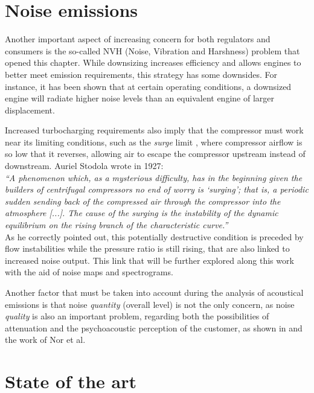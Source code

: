 \section{Noise emissions}

Another important aspect of increasing concern for both regulators and consumers is the so-called NVH (Noise, Vibration and Harshness) problem that opened this chapter. While downsizing increases efficiency and allows engines to better meet emission requirements, this strategy has some downsides. For instance, it has been shown \cite{stoffels2003nvh} that at certain operating conditions, a downsized engine will radiate higher noise levels than an equivalent engine of larger displacement.

Increased turbocharging requirements also imply that the compressor must work near its limiting conditions, such as the \emph{surge} limit \cite{teng2009investigation}, where compressor airflow is so low that it reverses, allowing air to escape the compressor upstream instead of downstream. Auriel Stodola \cite{stodola1927steam} wrote in 1927: \\

\emph{``A phenomenon which, as a mysterious difficulty, has in the beginning given the builders of centrifugal compressors no end of worry is `surging'; that is, a periodic sudden sending back of the compressed air through the compressor into the atmosphere [...]. The cause of the surging is the instability of the dynamic equilibrium on the rising branch of the characteristic curve.''}\\

As he correctly pointed out, this potentially destructive condition is preceded by flow instabilities while the pressure ratio is still rising, that are also linked to increased noise output. This link that will be further explored along this work with the aid of noise maps and spectrograms.

Another factor that must be taken into account during the analysis of acoustical emissions is that noise \emph{quantity} (overall level) is not the only concern, as noise \emph{quality} is also an important problem, regarding both the possibilities of attenuation and the psychoacoustic perception of the customer, as shown in \cite{brizon2012combining} and the work of Nor et al. \cite{nor2008index}

\section{State of the art}

